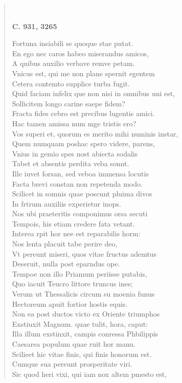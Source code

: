 \documentclass[11pt, a4paper]{report}
\begin{document}
\begin{verse}
        ﻿\pagebreak 
     \marginpar{[354]} \begin{center} \textbf{C. 931, 3265} \end{center}Fortuna insiabili se quoque stae putat. \\ En ego nec caros habeo miserandus amicos, \\ A quibus auxilio verbave remve petam. \\ Vnicus est, qui me non plane spernit egentem \\ Cetera contemto supplice turba fugit. \\ Quid faciam infelix que non nisi in omnibus uni est, \\ Sollicitem longo carine saepe fidem? \\ Fracta fides cebro est precibus lugentis amici. \\ Hac tamen amissa num mge tristis ero? \\ Vos superi et, quorum es merito mihi numinis instar, \\ Quem numquam poshac spero videre, parens, \\ Vnius in gemio spes nost abiecta sodalis \\ Tabet et absentis perdita veba sonnt. \\ Ille iuvet forsan, sed veboa immensa locutis \\ Facta brevi constan non repetenda modo. \\ Scilicet in somnis quae poscunt pluima divos \\ In frtrum auxiliis experietur inops. \\ Nos ubi praeteritis componimus orsa secuti \\ Tempois, his etiam credere fata vetant. \\ Interea rpit hor nee est reparabilis horm: \\ Nos lenta placuit tabe perire deo, \\ Vt pereunt miseri, quos vitae fructus ademtus \\ Deseruit, nulla post eparndus ope. \\ Tempoe non illo Priamum periisse putabis, \\ Quo iacuit Teucro littore truncus ines; \\ Verum ut Thessalicis circum su moenia funus \\ Hectoreum apuit fortior hostis equis. \\ Non ea post ductos victo ex Oriente triumphos \\ Exstiuxit Magnum. quae tulit, hora, caput: \\ Illa illum exstinxit, campis conressa Phbilippis \\ Caesarea populum quae ruit hor manu. \\ Scilieet hic vitae finis, qui finis honorum est. \\ Cumque sua pereunt prosperitate viri. \\ Sic quod heri vixi, qui iam nox altem pmesto est, \\ 

\end{verse}
\end{document}
